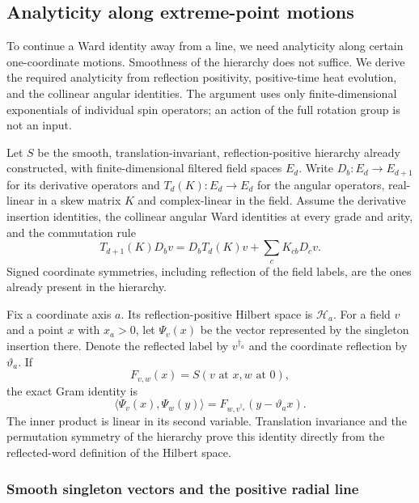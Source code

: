 \subsection{Analyticity along extreme-point motions}
\label{sec:physical-ward-analytic-continuation}

To continue a Ward identity away from a line, we need analyticity along
certain one-coordinate motions. Smoothness of the hierarchy does not
suffice. We derive the required analyticity from reflection positivity,
positive-time heat evolution, and the collinear angular identities. The
argument uses only finite-dimensional exponentials of individual spin
operators; an action of the full rotation group is not an input.

Let $S$ be the smooth, translation-invariant, reflection-positive hierarchy
already constructed, with finite-dimensional filtered field spaces $E_d$.
Write $D_b:E_d\to E_{d+1}$ for its derivative operators and
$T_d(K):E_d\to E_d$ for the angular operators, real-linear in a skew
matrix $K$ and complex-linear in the field. Assume the derivative insertion
identities, the collinear angular Ward identities at every grade and arity,
and the commutation rule
\begin{equation}\label{eq:ward-analytic-commute}
 T_{d+1}(K)D_bv=D_bT_d(K)v+\sum_c K_{cb}D_cv.
\end{equation}
Signed coordinate symmetries, including reflection of the field labels,
are the ones already present in the hierarchy.

Fix a coordinate axis $a$. Its reflection-positive Hilbert space is
$\mathcal H_a$. For a field $v$ and a point $x$ with $x_a>0$, let
$\Psi_v(x)$ be the vector represented by the singleton insertion there.
Denote the reflected label by $v^{\dagger_a}$ and the coordinate reflection
by $\vartheta_a$. If
\[
 F_{v,w}(x)=S(v\text{ at }x,w\text{ at }0),
\]
the exact Gram identity is
\begin{equation}\label{eq:ward-analytic-gram}
 \langle\Psi_v(x),\Psi_w(y)\rangle
       =F_{w,v^{\dagger_a}}(y-\vartheta_a x).
\end{equation}
The inner product is linear in its second variable. Translation invariance
and the permutation symmetry of the hierarchy prove this identity directly
from the reflected-word definition of the Hilbert space.

\subsubsection{Smooth singleton vectors and the positive radial line}


